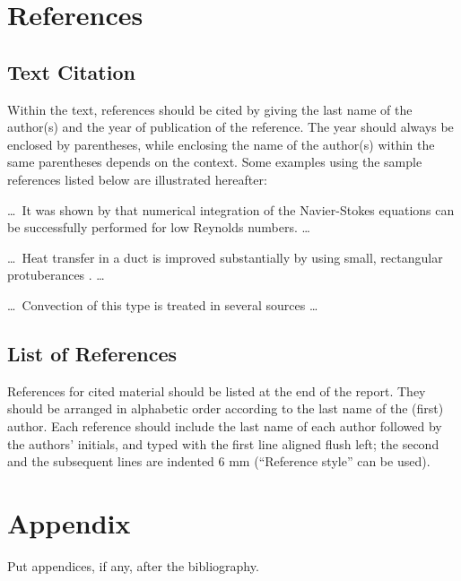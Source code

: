 \documentclass[bibtex,pagenumbers]{stabs2021}
\begin{document}
\section{References}

\subsection{Text Citation}

Within the text, references should be cited by giving the last name of
the author(s) and the year of publication of the reference. The year
should always be enclosed by parentheses, while enclosing the name of
the author(s) within the same parentheses depends on the context. Some
examples using the sample references listed below are illustrated
hereafter:



\dots\ It was shown by \citet{kwon1981prediction} that numerical
integration of the Navier-Stokes equations can be successfully
performed for low Reynolds numbers. \dots

\dots\ Heat transfer in a duct is improved substantially by using
small, rectangular protuberances \citep{sparrow1980forced}. \dots

\dots\ Convection of this type is treated in several sources
\citep{lee1982structure, sparrow1980fluid, tung1982evaporative} \dots

\subsection{List of References}

References for cited material should be listed at the end of the report. They should be arranged in alphabetic order according to the last name of the (first) author. Each reference should include the last name of each author followed by the authors’ initials, and typed with the first line aligned flush left; the second and the subsequent lines are indented 6 mm (``Reference style'' can be used).




\appendix

\section{Appendix}

Put appendices, if any, after the bibliography.
\end{document}
